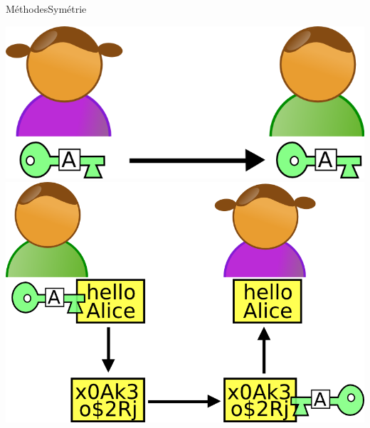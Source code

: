 \documentclass[12pt]{beamer}
\begin{document}
		\begin{frame}{Méthodes}{Symétrie}
			\begin{center}
				 \includegraphics[scale=.28]{symetric_cryptography_-_step_1.png}\vspace{.2cm}\\
				\onslide<2> \hspace{.5cm}\includegraphics[scale=.26]{symetric_cryptography_-_step_2.png}			
			\end{center}
		\end{frame}
		
\end{document}
